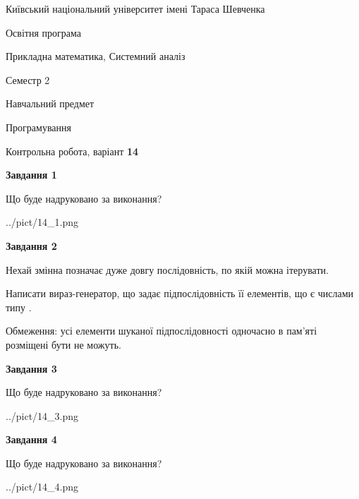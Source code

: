 \documentclass[12pt, ukrainian]{article}
\begin{document}
{{\begin {small}\par
{ \center  Київський національний університет імені Тараса Шевченка \par}
{\parbox {5 cm}{Освітня програма \hfill}{\parbox {8 cm}{Прикладна математика, Системний аналіз \hfill}}\parbox {5 cm}{\hfill Семестр 2}}\par
{\parbox {5 cm} {Навчальний предмет \hfill}\parbox {7 cm}{Програмування \hfill}\parbox {6cm}{\hfill}\par}\vspace{-7pt} \end{small}}{\center Контрольна робота, варіант  \No \textbf
{ 14 }\par}}
{
\begin {large}
{\begin {center}\textbf{Завдання 1}\end {center}}\par
Що буде надруковано за виконання?\par\par
\begin{center}
	{../pict/14_1.png}
\end{center}
\newpage

{\begin {center}\textbf{Завдання 2}\end {center}}\par
Нехай змінна  позначає дуже довгу послідовність, по якій можна ітерувати.

Написати вираз-генератор, що задає підпослідовність її елементів, що є числами типу .

Обмеження: усі елементи шуканої підпослідовності одночасно в пам'яті розміщені бути не можуть.\par
\newpage

{\begin {center}\textbf{Завдання 3}\end {center}}\par
Що буде надруковано за виконання?\par
\begin{center}
	{../pict/14_3.png}
\end{center}
\newpage

{\begin {center}\textbf{Завдання 4}\end {center}}\par
Що буде надруковано за виконання?\par
\begin{center}
	{../pict/14_4.png}
\end{center}
\newpage


\end{large}}
\end{document}
